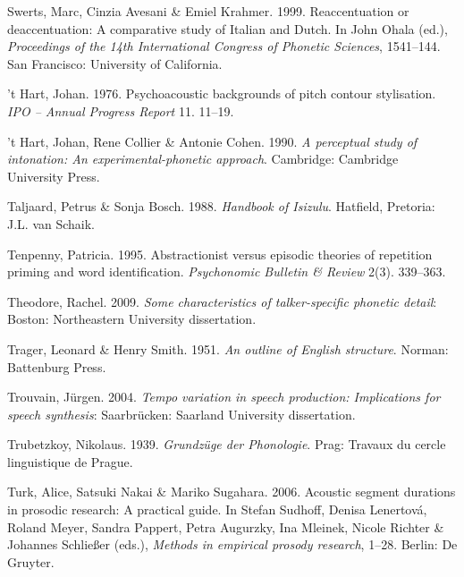 \documentclass[ number=1
,series=labphon
,output=long
,url=http://langsci-press.org/catalog/book/16
,isbn=978-3-944675-01-5
]{LSP/langsci}
\begin{document}
\begin{thebibliography}{284}
Swerts, Marc, Cinzia Avesani \& Emiel Krahmer. 1999.
\newblock Reaccentuation or deaccentuation: {A} comparative study of {I}talian
  and {D}utch.
\newblock In John Ohala (ed.), \emph{Proceedings of the 14th {I}nternational
  {C}ongress of {P}honetic {S}ciences}, 1541--144. San Francisco: University of
  California.

{'t Hart}, Johan. 1976.
\newblock Psychoacoustic backgrounds of pitch contour stylisation.
\newblock \emph{IPO -- Annual Progress Report} 11. 11--19.

{'t Hart}, Johan, Rene Collier \& Antonie Cohen. 1990.
\newblock \emph{A perceptual study of intonation: {A}n experimental-phonetic
  approach}.
\newblock Cambridge: Cambridge University Press.

Taljaard, Petrus \& Sonja Bosch. 1988.
\newblock \emph{Handbook of {I}sizulu}.
\newblock Hatfield, Pretoria: J.L. van Schaik.

Tenpenny, Patricia. 1995.
\newblock Abstractionist versus episodic theories of repetition priming and
  word identification.
\newblock \emph{Psychonomic Bulletin \& Review} 2(3). 339--363.

Theodore, Rachel. 2009.
\newblock \emph{Some characteristics of talker-specific phonetic detail}:
  Boston: Northeastern University dissertation.

Trager, Leonard \& Henry Smith. 1951.
\newblock \emph{An outline of {E}nglish structure}.
\newblock Norman: Battenburg Press.

Trouvain, Jürgen. 2004.
\newblock \emph{Tempo variation in speech production: {I}mplications for speech
  synthesis}: Saarbr{\"u}cken: Saarland University dissertation.

Trubetzkoy, Nikolaus. 1939.
\newblock \emph{Grundz\"{u}ge der {P}honologie}.
\newblock Prag: Travaux du cercle linguistique de Prague.

Turk, Alice, Satsuki Nakai \& Mariko Sugahara. 2006.
\newblock Acoustic segment durations in prosodic research: {A} practical guide.
\newblock In Stefan Sudhoff, Denisa Lenertov\'{a}, Roland Meyer, Sandra
  Pappert, Petra Augurzky, Ina Mleinek, Nicole Richter \& Johannes
  Schlie\ss{}er (eds.), \emph{Methods in empirical prosody research}, 1--28.
  Berlin: De Gruyter.


\end{thebibliography}
\end{document}

